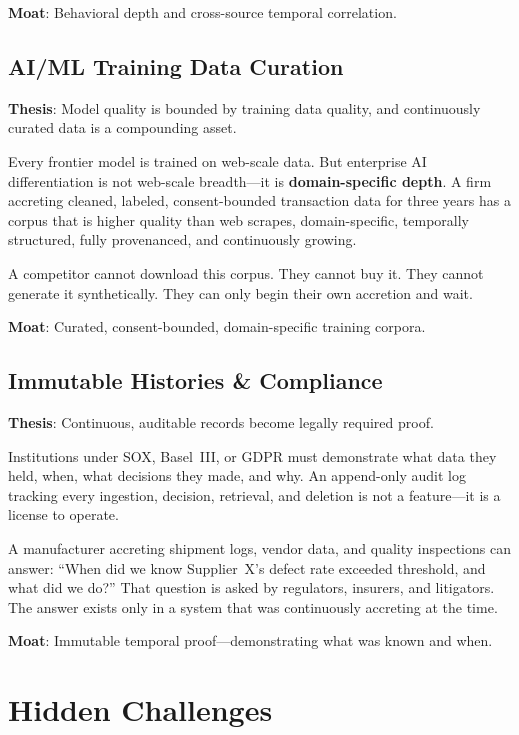 \documentclass[11pt,twocolumn]{article}
\begin{document}
\textbf{Moat}: Behavioral depth and cross-source temporal correlation.

\subsection{AI/ML Training Data Curation}

\textbf{Thesis}: Model quality is bounded by training data quality, and continuously curated data is a compounding asset.

Every frontier model is trained on web-scale data. But enterprise AI differentiation is not web-scale breadth---it is \textbf{domain-specific depth}. A firm accreting cleaned, labeled, consent-bounded transaction data for three years has a corpus that is higher quality than web scrapes, domain-specific, temporally structured, fully provenanced, and continuously growing.

A competitor cannot download this corpus. They cannot buy it. They cannot generate it synthetically. They can only begin their own accretion and wait.

\textbf{Moat}: Curated, consent-bounded, domain-specific training corpora.

\subsection{Immutable Histories \& Compliance}

\textbf{Thesis}: Continuous, auditable records become legally required proof.

Institutions under SOX, Basel~III, or GDPR must demonstrate what data they held, when, what decisions they made, and why. An append-only audit log tracking every ingestion, decision, retrieval, and deletion is not a feature---it is a license to operate.

A manufacturer accreting shipment logs, vendor data, and quality inspections can answer: ``When did we know Supplier~X's defect rate exceeded threshold, and what did we do?'' That question is asked by regulators, insurers, and litigators. The answer exists only in a system that was continuously accreting at the time.

\textbf{Moat}: Immutable temporal proof---demonstrating what was known and when.

\section{Hidden Challenges}
\end{document}

